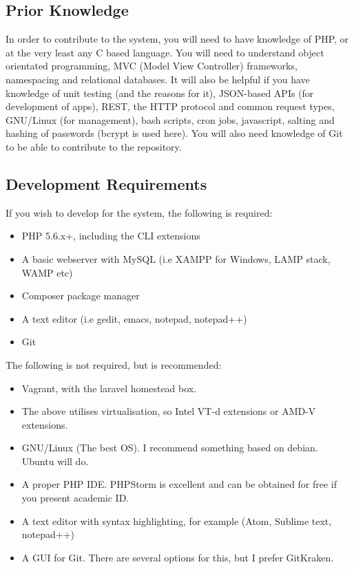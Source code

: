 \documentclass{article}
\begin{document}
\subsection{Prior Knowledge}
In order to contribute to the system, you will need to have knowledge of PHP, or at the very least any C based language. You will need to understand object orientated programming, MVC (Model View Controller) frameworks, namespacing and relational databases. It will also be helpful if you have knowledge of unit testing (and the reasons for it), JSON-based APIs (for development of apps), REST, the HTTP protocol and common request types, GNU/Linux (for management), bash scripts, cron jobs, javascript, salting and hashing of passwords (bcrypt is used here). You will also need knowledge of Git to be able to contribute to the repository.

\subsection{Development Requirements}
If you wish to develop for the system, the following is required:

\begin{itemize}
	\item PHP 5.6.x+, including the CLI extensions
	\item A basic webserver with MySQL (i.e XAMPP for Windows, LAMP stack, WAMP etc)
	\item Composer package manager
	\item A text editor (i.e gedit, emacs, notepad, notepad++)
	\item Git
\end{itemize}

The following is not required, but is recommended:
\begin{itemize}
	\item Vagrant, with the laravel homestead box.
	\item The above utilises virtualisation, so Intel VT-d extensions or AMD-V extensions.
	\item GNU/Linux (The best OS). I recommend something based on debian. Ubuntu will do.
	\item A proper PHP IDE. PHPStorm is excellent and can be obtained for free if you present academic ID.
	\item A text editor with syntax highlighting, for example (Atom, Sublime text, notepad++)
	\item A GUI for Git. There are several options for this, but I prefer GitKraken.
\end{itemize}
\end{document}
